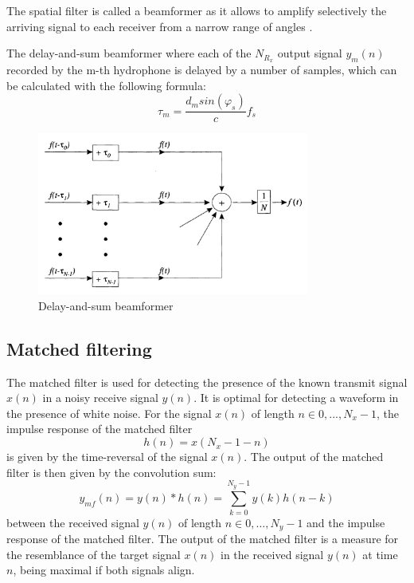 \documentclass[11pt]{article}
\begin{document}
The spatial filter is called a beamformer as it allows to amplify selectively the arriving signal to each receiver from a narrow range of angles \cite{hodges_underwater_2011}.
	
	The delay-and-sum beamformer where each of the $N_{R_x}$ output signal $y_m(n)$ recorded by the m-th hydrophone is delayed by a number of samples, which can be calculated with the following formula:
\begin{equation}
\tau_m=\frac{d_m sin(\varphi_s)}{c}f_s
\label{eqn:delay-and-sum-beam-delay}
\end{equation}

\begin{figure} [H][htbp] %
   \centering
   \includegraphics[width=0.8\textwidth]{figures/delay-and-sum.png} 
   \caption{Delay-and-sum beamformer \cite{trees_optimum_2002}}
   \label{fig:delay-and-sum}
\end{figure}

\subsection{Matched filtering}

The matched filter is used for detecting the presence of the known transmit signal $x(n)$ in a noisy receive signal $y(n)$. It is optimal for detecting a waveform in the presence of white noise. For the signal $x(n)$ of length $n \in 0, ..., N_x − 1$, the impulse response of the matched filter
\[h(n) = x(N_x − 1 − n)\] is given by the time-reversal of the signal $x(n)$. The output of the matched filter is then given by the convolution sum:
\begin{equation}
y_{mf}(n) = y(n)*h(n) = \sum_{k=0}^{N_y-1}y(k)h(n-k)
\end{equation}
between the received signal $y(n)$ of length $n \in 0, \ldots , N_y − 1$ and the impulse response of the matched filter. The output of the matched filter is a measure for the resemblance of the target signal $x(n)$ in the received signal $y(n)$ at time $n$, being maximal if both signals align.
\end{document}
